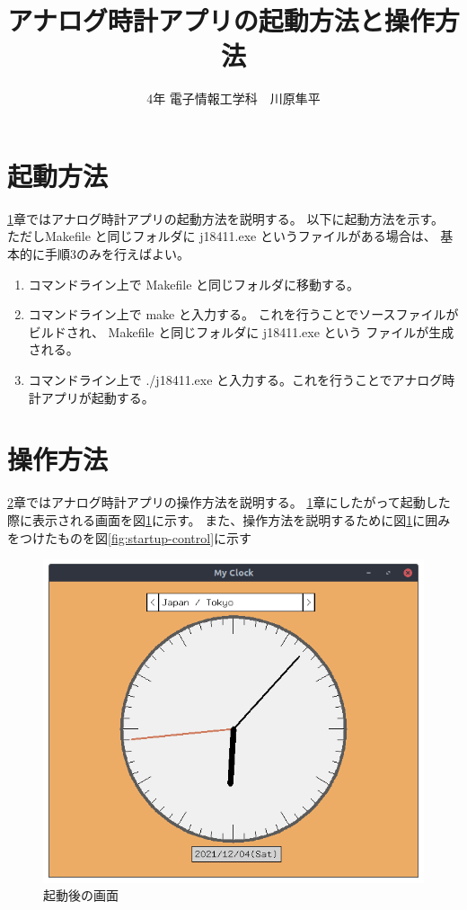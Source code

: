 \documentclass[a4paper,11pt]{jsarticle}
\begin{document}
\title{アナログ時計アプリの起動方法と操作方法}
\author{4年 電子情報工学科　川原隼平}
\date{}
\maketitle
  \section{起動方法}\label{sec:startup}
    \ref{sec:startup}章ではアナログ時計アプリの起動方法を説明する。
    以下に起動方法を示す。
    ただしMakefile と同じフォルダに j18411.exe というファイルがある場合は、
    基本的に手順3のみを行えばよい。

    \begin{enumerate}
      \item コマンドライン上で Makefile と同じフォルダに移動する。
      \item コマンドライン上で make と入力する。
      これを行うことでソースファイルがビルドされ、 Makefile と同じフォルダに j18411.exe という
      ファイルが生成される。
      \item コマンドライン上で ./j18411.exe と入力する。これを行うことでアナログ時計アプリが起動する。
    \end{enumerate}

  \section{操作方法}\label{sec:control}
    \ref{sec:control}章ではアナログ時計アプリの操作方法を説明する。
    \ref{sec:startup}章にしたがって起動した際に表示される画面を図\ref{fig:startup}に示す。
    また、操作方法を説明するために図\ref{fig:startup}に囲みをつけたものを図\ref{fig:startup-control}に示す

    \begin{figure}[H]
      \centering
      \includegraphics[scale=0.3]{./readme_img/startup.png}
      \caption{起動後の画面}
      \label{fig:startup}
    \end{figure}
\end{document}
